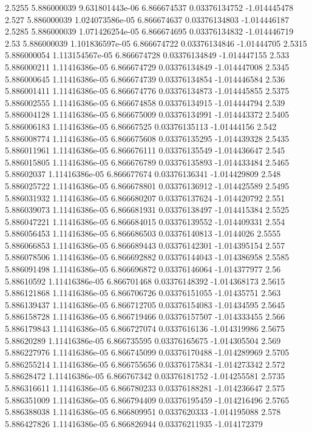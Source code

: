 {2.5255 5.886000039 9.631801443e-06 6.866674537 0.03376134752 -1.014445478
2.527 5.886000039 1.024073586e-05 6.866674637 0.03376134803 -1.014446187
2.5285 5.886000039 1.071426254e-05 6.866674695 0.03376134832 -1.014446719
2.53 5.886000039 1.101836597e-05 6.866674722 0.03376134846 -1.01444705
2.5315 5.886000054 1.113154567e-05 6.866674728 0.03376134849 -1.014447155
2.533 5.886000211 1.11416386e-05 6.866674729 0.03376134849 -1.014447008
2.5345 5.886000645 1.11416386e-05 6.866674739 0.03376134854 -1.014446584
2.536 5.886001411 1.11416386e-05 6.866674776 0.03376134873 -1.014445855
2.5375 5.886002555 1.11416386e-05 6.866674858 0.03376134915 -1.014444794
2.539 5.886004128 1.11416386e-05 6.866675009 0.03376134991 -1.014443372
2.5405 5.886006183 1.11416386e-05 6.86667525 0.03376135113 -1.01444156
2.542 5.886008774 1.11416386e-05 6.866675608 0.03376135295 -1.014439328
2.5435 5.886011961 1.11416386e-05 6.866676111 0.03376135549 -1.014436647
2.545 5.886015805 1.11416386e-05 6.866676789 0.03376135893 -1.014433484
2.5465 5.88602037 1.11416386e-05 6.866677674 0.03376136341 -1.014429809
2.548 5.886025722 1.11416386e-05 6.866678801 0.03376136912 -1.014425589
2.5495 5.886031932 1.11416386e-05 6.866680207 0.03376137624 -1.014420792
2.551 5.886039073 1.11416386e-05 6.866681931 0.03376138497 -1.014415384
2.5525 5.886047221 1.11416386e-05 6.866684015 0.03376139552 -1.014409331
2.554 5.886056453 1.11416386e-05 6.866686503 0.03376140813 -1.0144026
2.5555 5.886066853 1.11416386e-05 6.866689443 0.03376142301 -1.014395154
2.557 5.886078506 1.11416386e-05 6.866692882 0.03376144043 -1.014386958
2.5585 5.886091498 1.11416386e-05 6.866696872 0.03376146064 -1.014377977
2.56 5.88610592 1.11416386e-05 6.866701468 0.03376148392 -1.014368173
2.5615 5.886121868 1.11416386e-05 6.866706726 0.03376151055 -1.01435751
2.563 5.886139437 1.11416386e-05 6.866712705 0.03376154083 -1.01434595
2.5645 5.886158728 1.11416386e-05 6.866719466 0.03376157507 -1.014333455
2.566 5.886179843 1.11416386e-05 6.866727074 0.0337616136 -1.014319986
2.5675 5.88620289 1.11416386e-05 6.866735595 0.03376165675 -1.014305504
2.569 5.886227976 1.11416386e-05 6.866745099 0.03376170488 -1.014289969
2.5705 5.886255214 1.11416386e-05 6.866755656 0.03376175834 -1.014273342
2.572 5.88628472 1.11416386e-05 6.866767342 0.03376181752 -1.014255581
2.5735 5.886316611 1.11416386e-05 6.866780233 0.03376188281 -1.014236647
2.575 5.886351009 1.11416386e-05 6.866794409 0.03376195459 -1.014216496
2.5765 5.886388038 1.11416386e-05 6.866809951 0.0337620333 -1.014195088
2.578 5.886427826 1.11416386e-05 6.866826944 0.03376211935 -1.014172379
}
